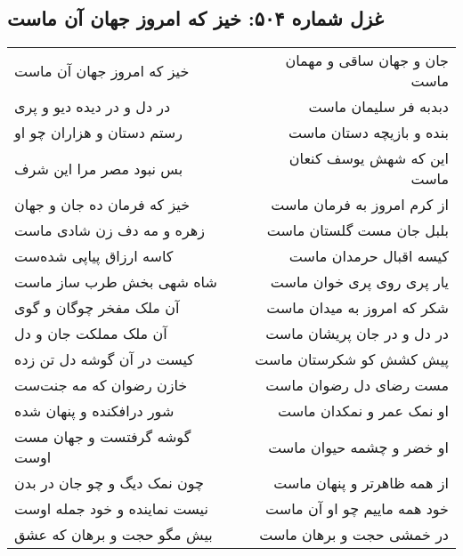 \begin{center}
\section*{غزل شماره ۵۰۴: خیز که امروز جهان آن ماست}
\label{sec:0504}
\begin{longtable}{l p{0.5cm} r}
خیز که امروز جهان آن ماست
&&
جان و جهان ساقی و مهمان ماست
\\
در دل و در دیده دیو و پری
&&
دبدبه فر سلیمان ماست
\\
رستم دستان و هزاران چو او
&&
بنده و بازیچه دستان ماست
\\
بس نبود مصر مرا این شرف
&&
این که شهش یوسف کنعان ماست
\\
خیز که فرمان ده جان و جهان
&&
از کرم امروز به فرمان ماست
\\
زهره و مه دف زن شادی ماست
&&
بلبل جان مست گلستان ماست
\\
کاسه ارزاق پیاپی شده‌ست
&&
کیسه اقبال حرمدان ماست
\\
شاه شهی بخش طرب ساز ماست
&&
یار پری روی پری خوان ماست
\\
آن ملک مفخر چوگان و گوی
&&
شکر که امروز به میدان ماست
\\
آن ملک مملکت جان و دل
&&
در دل و در جان پریشان ماست
\\
کیست در آن گوشه دل تن زده
&&
پیش کشش کو شکرستان ماست
\\
خازن رضوان که مه جنت‌ست
&&
مست رضای دل رضوان ماست
\\
شور درافکنده و پنهان شده
&&
او نمک عمر و نمکدان ماست
\\
گوشه گرفتست و جهان مست اوست
&&
او خضر و چشمه حیوان ماست
\\
چون نمک دیگ و چو جان در بدن
&&
از همه ظاهرتر و پنهان ماست
\\
نیست نماینده و خود جمله اوست
&&
خود همه ماییم چو او آن ماست
\\
بیش مگو حجت و برهان که عشق
&&
در خمشی حجت و برهان ماست
\\
\end{longtable}
\end{center}
